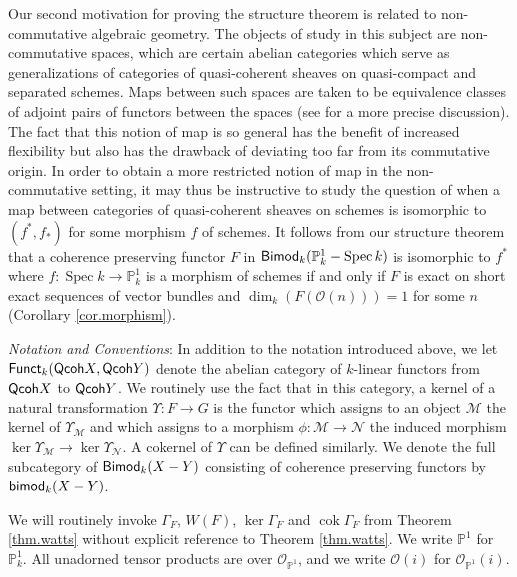 \documentclass[10pt]{amsart}
\theoremstyle{definition}
\theoremstyle{remark}
\numberwithin{equation}{section}
\begin{document}
Our second motivation for proving the structure theorem is related to non-commutative algebraic geometry.  The objects of study in this subject are non-commutative spaces, which are certain abelian categories which serve as generalizations of categories of quasi-coherent sheaves on quasi-compact and separated schemes.  Maps between such spaces are taken to be equivalence classes of adjoint pairs of functors between the spaces (see \cite[Definition 2.3]{Smith} for a more precise discussion).  The fact that this notion of map is so general has the benefit of increased flexibility but also has the drawback of deviating too far from its commutative origin.  In order to obtain a more restricted notion of map in the non-commutative setting, it may thus be instructive to study the question of when a map between categories of quasi-coherent sheaves on schemes is isomorphic to $(f^{*},f_{*})$ for some morphism $f$ of schemes.  It follows from our structure theorem that a coherence preserving functor $F$ in ${\sf Bimod}_{k}(\mathbb{P}^{1}_{k}-\operatorname{Spec }k)$ is isomorphic to $f^{*}$ where $f:\operatorname{Spec }k \rightarrow \mathbb{P}_{k}^{1}$ is a morphism of schemes if and only if $F$ is exact on short exact sequences of vector bundles and $\operatorname{dim }_{k}(F(\mathcal{O}(n)))=1$ for some $n$ (Corollary \ref{cor.morphism}).

\medskip

{\it Notation and Conventions}: In addition to the notation introduced above, we let ${\sf Funct}_{k}({\sf Qcoh }X,{\sf Qcoh }Y)$ denote the abelian category of $k$-linear functors from ${\sf Qcoh }X$ to ${\sf Qcoh }Y$.  We routinely use the fact that in this category, a kernel of a natural transformation $\Upsilon:F \rightarrow G$ is the functor which assigns to an object $\mathcal{M}$ the kernel of $\Upsilon_{\mathcal{M}}$ and which assigns to a morphism $\phi:\mathcal{M} \rightarrow \mathcal{N}$ the induced morphism $\operatorname{ker }\Upsilon_{\mathcal{M}} \rightarrow \operatorname{ker }\Upsilon_{\mathcal{N}}$.  A cokernel of $\Upsilon$ can be defined similarly.  We denote the full subcategory of ${\sf Bimod}_{k}(X-Y)$ consisting of coherence preserving functors by ${\sf bimod}_{k}(X-Y)$.

We will routinely invoke $\Gamma_{F}$, $W(F)$, ${\operatorname{ker }\Gamma_{F}}$ and ${\operatorname{cok }\Gamma_{F}}$ from Theorem \ref{thm.watts} without explicit reference to Theorem \ref{thm.watts}.  We write $\mathbb{P}^{1}$ for $\mathbb{P}_{k}^{1}$.  All unadorned tensor products are over $\mathcal{O}_{\mathbb{P}^{1}}$, and we write $\mathcal{O}(i)$ for $\mathcal{O}_{\mathbb{P}^{1}}(i)$.
\end{document}
